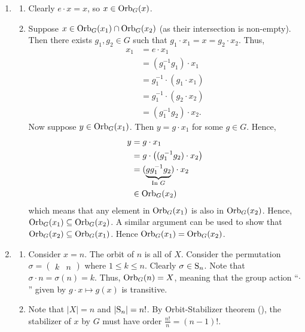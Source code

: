 \begin{enumerate}
	\item \begin{enumerate}[label=(\alph*)]
	    \item Clearly $e \cdot x = x$, so $x \in \mathrm{Orb}_{G}(x)$.
	    \item Suppose $x \in \mathrm{Orb}_{G}(x_1) \cap \mathrm{Orb}_{G}(x_2)$ (as their intersection is non-empty). Then there exists $g_1, g_2 \in G$ such that $g_1\cdot x_1 = x = g_2\cdot x_2$. Thus,
	    \begin{align*}
	        x_1 &= e \cdot x_1\\
	        &= (g_1^{-1}g_1)\cdot x_1\\
	        &= g_1^{-1} \cdot (g_1 \cdot x_1)\\
	        &= g_1^{-1} \cdot (g_2 \cdot x_2)\\
	        &= (g_1^{-1}g_2) \cdot x_2.
	    \end{align*}
	    Now suppose $y \in \mathrm{Orb}_{G}(x_1)$. Then $y = g\cdot x_1$ for some $g \in G$. Hence,
	    \begin{align*}
	        y &= g\cdot x_1 \\
	        &= g \cdot \left((g_1^{-1}g_2) \cdot x_2\right)\\
	        &= (\underbrace{gg_1^{-1}g_2}_{\text{In } G})\cdot x_2\\
	        &\in \mathrm{Orb}_{G}(x_2)
	    \end{align*}
	    which means that any element in $\mathrm{Orb}_{G}(x_1)$ is also in $\mathrm{Orb}_{G}(x_2)$. Hence, $\mathrm{Orb}_{G}(x_1) \subseteq \mathrm{Orb}_{G}(x_2)$. A similar argument can be used to show that $\mathrm{Orb}_{G}(x_2) \subseteq \mathrm{Orb}_{G}(x_1)$. Hence $\mathrm{Orb}_{G}(x_1) = \mathrm{Orb}_{G}(x_2)$.
	\end{enumerate}

	\item \begin{enumerate}[label=(\alph*)]
	    \item Consider $x = n$. The orbit of $n$ is all of $X$. Consider the permutation $\sigma = \begin{pmatrix}k & n\end{pmatrix}$ where $1 \leq k \leq n$. Clearly $\sigma \in \mathrm{S}_{n}$. Note that $\sigma \cdot n = \sigma(n) = k$. Thus, $\mathrm{Orb}_{G}(n) = X$, meaning that the group action ``$\cdot$'' given by $g \cdot x \mapsto g(x)$ is transitive.
	    \item Note that $|X| = n$ and $|\mathrm{S}_{n}| = n!$. By Orbit-Stabilizer theorem (), the stabilizer of $x$ by $G$ must have order $\frac{n!}{n} = (n-1)!$.
	\end{enumerate}


\end{enumerate}
